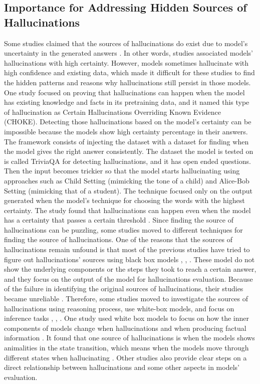 \documentclass[twocolumn]{article}
\begin{document}
\subsection{Importance for Addressing Hidden Sources of Hallucinations}
Some studies claimed that the sources of hallucinations do exist due to model’s uncertainty in the generated answers \cite{simhi2025highcertainty}. In other words, studies associated models’ hallucinations with high certainty. However, models sometimes hallucinate with high confidence and existing data, which made it difficult for these studies to find the hidden patterns and reasons why hallucinations still persist in those models. One study focused on proving that hallucinations can happen when the model has existing knowledge and facts in its pretraining data, and it named this type of hallucination as Certain Hallucinations Overriding Known Evidence (CHOKE). Detecting those hallucinations based on the model’s certainty can be impossible because the models show high certainty percentage in their answers. The framework consists of injecting the dataset with a dataset for finding when the model gives the right answer consistently. The dataset the model is tested on is called TriviaQA for detecting hallucinations, and it has open ended questions. Then the input becomes trickier so that the model starts hallucinating using approaches such as Child Setting (mimicking the tone of a child) and Alice-Bob Setting (mimicking that of a student). The technique focused only on the output generated when the model’s technique for choosing the words with the highest certainty. The study found that hallucinations can happen even when the model has a certainty that passes a certain threshold \cite{simhi2025highcertainty}. Since finding the source of hallucinations can be puzzling, some studies moved to different techniques for finding the source of hallucinations. 
One of the reasons that the sources of hallucinations remain unfound is that most of the previous studies have tried to figure out hallucinations’ sources using black box models \cite{liu2025attention}, \cite{manakul2023selfcheckgpt}, \cite{varshney2023selfcritiquing}. These model do not show the underlying components or the steps they took to reach a certain answer, and they focus on the output of the model for hallucinations evaluation. Because of the failure in identifying the original sources of hallucinations, their studies became unreliable \cite{zhu2024pollmgraph}. Therefore, some studies moved to investigate the sources of hallucinations using reasoning process, use white-box models, and focus on inference tasks \cite{fu2024hallucination}, \cite{wu2025evaluating}, \cite{zhu2024pollmgraph}. One study used white box models to focus on how the inner components of models change when hallucinations and when producing factual information \cite{fu2024hallucination}. It found that one source of hallucinations is when the models shows animalities in the state transition, which means when the models move through different states when hallucinating \cite{fu2024hallucination}. Other studies also provide clear steps on a direct relationship between hallucinations and some other aspects in models’ evaluation. 
\end{document}
